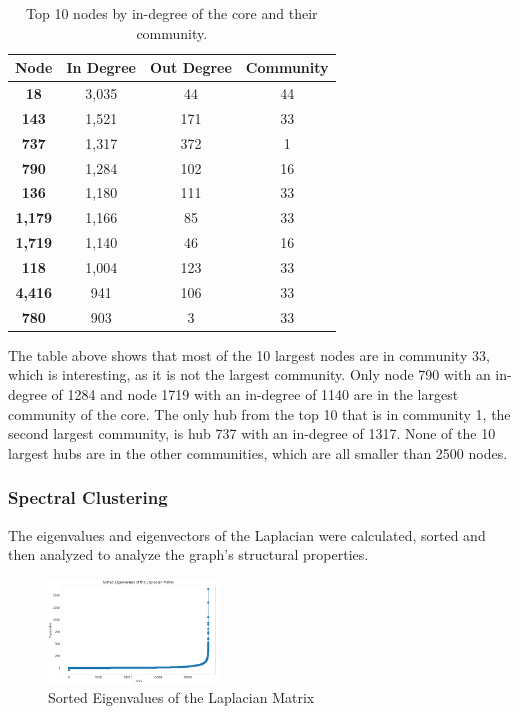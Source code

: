 \documentclass[conference]{IEEEtran}
\begin{document}
\begin{table}[h!]
\centering
\begin{tabular}{|c|c|c|c|}
\toprule
\textbf{Node} & \textbf{In Degree} & \textbf{Out Degree} & \textbf{Community}\\
\midrule
\textbf{18} & 3,035 &  44 & 44 \\
\textbf{143} & 1,521 & 171 & 33 \\
\textbf{737} & 1,317 & 372 & 1 \\
\textbf{790} & 1,284 & 102 & 16 \\
\textbf{136} & 1,180 & 111 & 33 \\
\textbf{1,179} & 1,166 & 85 & 33 \\
\textbf{1,719} & 1,140 & 46 & 16 \\
\textbf{118} & 1,004 & 123 & 33 \\
\textbf{4,416} & 941 & 106 & 33 \\
\textbf{780} & 903 & 3 & 33 \\
\bottomrule
\end{tabular}
\caption{Top 10 nodes by in-degree of the core and their community.}
\label{tab:top_in_deg_community}
\end{table}

The table above shows that most of the 10 largest nodes are in community 33, which is interesting, as it is not the largest community. Only node 790 with an in-degree of 1284 and node 1719 with an in-degree of 1140 are in the largest community of the core. The only hub from the top 10 that is in community 1, the second largest community, is hub 737 with an in-degree of 1317. None of the 10 largest hubs are in the other communities, which are all smaller than 2500 nodes.

\subsubsection{Spectral Clustering }
The eigenvalues and eigenvectors of the Laplacian were calculated, sorted and then analyzed to analyze the graph's structural properties.

\begin{figure}[H]
    \centerline{\includegraphics[width=0.4\textwidth]{img/sorted_eigenvalues_plot.png}}
    \centering
    \caption{Sorted Eigenvalues of the Laplacian Matrix}
    \label{fig:sorted_eigenvalues}
\end{figure}
\end{document}
